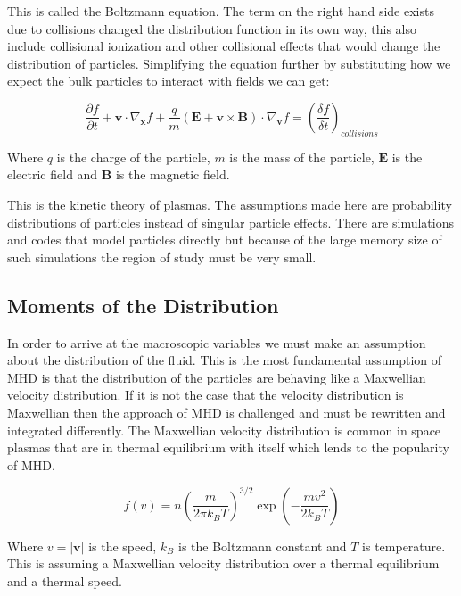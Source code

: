 \documentclass[12pt,upcase]{umlthesis}
\begin{document}
This is called the Boltzmann equation. The term on the right hand side exists due to collisions changed the distribution function in its own way, this also include collisional ionization and other collisional effects that would change the distribution of particles. Simplifying the equation further by substituting how we expect the bulk particles to interact with fields we can get:

\begin{equation}
	\frac{\partial f}{\partial t} + \textbf{v} \cdot \nabla_{\textbf{x}} f + \frac{q}{m} (\textbf{E} + \textbf{v} \times \textbf{B}) \cdot \nabla_{\textbf{v}} f = {(\frac{\delta f}{\delta t})}_{collisions}
\end{equation}

Where $q$ is the charge of the particle, $m$ is the mass of the particle, $\textbf{E}$ is the electric field and $\textbf{B}$ is the magnetic field.

This is the kinetic theory of plasmas. The assumptions made here are probability distributions of particles instead of singular particle effects. There are simulations and codes that model particles directly but because of the large memory size of such simulations the region of study must be very small. 

\subsection{Moments of the Distribution}\label{sec:moments}

In order to arrive at the macroscopic variables we must make an assumption about the distribution of the fluid. This is the most fundamental assumption of MHD is that the distribution of the particles are behaving like a Maxwellian velocity distribution. If it is not the case that the velocity distribution is Maxwellian then the approach of MHD is challenged and must be rewritten and integrated differently. The Maxwellian velocity distribution is common in space plasmas that are in thermal equilibrium with itself which lends to the popularity of MHD\@.

\begin{equation}
	f(v) = n {(\frac{m}{2\pi k_B T})}^{3/2} \exp{(-\frac{mv^2}{2k_B T})}
\end{equation}

Where $v = |\textbf{v}|$ is the speed, $k_B$ is the Boltzmann constant and $T$ is temperature. This is assuming a Maxwellian velocity distribution over a thermal equilibrium and a thermal speed.
\end{document}
